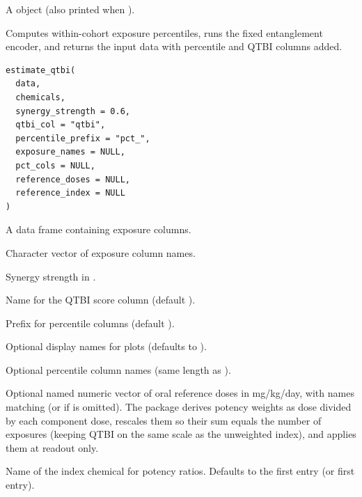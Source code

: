 \documentclass[a4paper]{book}
\begin{document}
%
\begin{Value}
A  object (also printed when ).
\end{Value}
%
\begin{Description}
Computes within-cohort exposure percentiles, runs the fixed entanglement
encoder, and returns the input data with percentile and QTBI columns added.
\end{Description}
%
\begin{Usage}
\begin{verbatim}
estimate_qtbi(
  data,
  chemicals,
  synergy_strength = 0.6,
  qtbi_col = "qtbi",
  percentile_prefix = "pct_",
  exposure_names = NULL,
  pct_cols = NULL,
  reference_doses = NULL,
  reference_index = NULL
)
\end{verbatim}
\end{Usage}
%
\begin{Arguments}
\begin{ldescription}
\item[\code{data}] A data frame containing exposure columns.

\item[\code{chemicals}] Character vector of exposure column names.

\item[\code{synergy\_strength}] Synergy strength in \AsIs{\texttt{[0, 1]}}.

\item[\code{qtbi\_col}] Name for the QTBI score column (default ).

\item[\code{percentile\_prefix}] Prefix for percentile columns (default ).

\item[\code{exposure\_names}] Optional display names for plots (defaults to ).

\item[\code{pct\_cols}] Optional percentile column names (same length as ).

\item[\code{reference\_doses}] Optional named numeric vector of oral reference doses
in mg/kg/day, with names matching  (or  if
 is omitted). The package derives potency weights as
 dose divided by each component dose, rescales them so
their sum equals the number of exposures (keeping QTBI on the same
\eqn{[0, n]}{} scale as the unweighted index), and applies them at readout only.

\item[\code{reference\_index}] Name of the index chemical for potency ratios. Defaults
to the first  entry (or first  entry).
\end{ldescription}
\end{Arguments}
\end{document}
